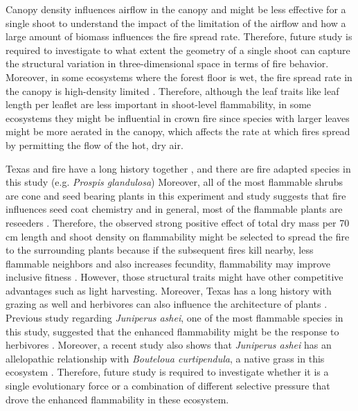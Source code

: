 \documentclass[12pt]{report}
\begin{document}
Canopy density influences airflow in the canopy \citep{cionco1978analysis} and might be less effective for a single shoot to understand the impact of the limitation of the airflow and how a large amount of biomass influences the fire spread rate. %
Therefore, future study is required to investigate to what extent the geometry of a single shoot can capture the structural variation in three-dimensional space in terms of fire behavior. Moreover, in some ecosystems where the forest floor is wet, the fire spread rate in the canopy is high-density limited  \citep{ray2005micrometeorological}. Therefore, although the leaf traits like leaf length per leaflet are less important in shoot-level flammability, in some ecosystems they might be influential in crown fire since species with larger leaves might be more aerated in the canopy, which affects the rate at which fires spread by permitting the flow of the hot, dry air. 

Texas and fire have a long history together \citep{moir1982firehistory, stambaugh2011firehistory,stambaugh2014historicalfirehistory,smeins2005historyoffire1}, and there are fire adapted species in this study (e.g. \emph{Prospis glandulosa}) \citep{glandulosahoney,wright1976effect} %
Moreover, all of the most flammable shrubs are cone and seed bearing plants in this experiment 
and study suggests that fire influences seed coat chemistry \citep{mcinnes2022doesseedcoatchemistry} and in general, most of the flammable plants are reseeders \citep{midgley2011pushingreseeders}. Therefore,  the observed strong positive effect of total dry mass per 70\,cm length and shoot density on flammability might be selected to spread the fire to the surrounding plants because if the subsequent fires kill nearby, less flammable neighbors and also increases fecundity, flammability may improve inclusive fitness \citep{bond1995kill}. However, those structural traits might have other competitive advantages such as light harvesting. Moreover, Texas has a long history with grazing as well and herbivores can also influence the architecture of plants \citep{danell1994browseeffects}. Previous study regarding \emph{Juniperus ashei}, one of the most flammable species in this study, suggested that the enhanced flammability might be the response to herbivores \citep{owens1998seasonal}. Moreover, a recent study also shows that \emph{Juniperus ashei} has an allelopathic relationship with \emph{Bouteloua curtipendula}, a native grass in this ecosystem \citep{young2009assessmentallelopathy}. Therefore, future study is required to investigate whether it is a single evolutionary force or a combination of different selective pressure that drove the enhanced flammability in these ecosystem.
\end{document}
